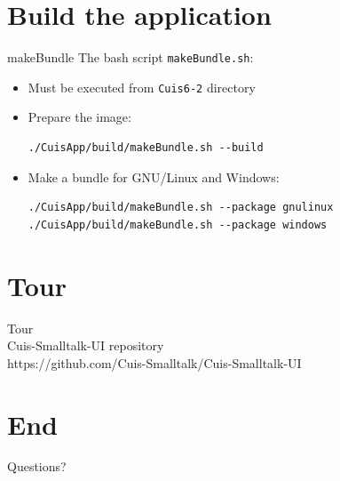 \documentclass{beamer}
\begin{document}
\begin{lstlisting}[language=Smalltalk]
\end{lstlisting}

\section{Build the application}
\begin{frame}[fragile]{makeBundle}
  The bash script \texttt{makeBundle.sh}:
  \begin{itemize}
  \item Must be executed from \texttt{Cuis6-2} directory
  \item Prepare the image:
\begin{verbatim}
./CuisApp/build/makeBundle.sh --build
\end{verbatim}
  \item Make a bundle for GNU/Linux and Windows:
\begin{verbatim}
./CuisApp/build/makeBundle.sh --package gnulinux
./CuisApp/build/makeBundle.sh --package windows
\end{verbatim}
  \end{itemize}
\end{frame}  

\section{Tour}
\begin{frame}
  \begin{center}
    Tour\\
    Cuis-Smalltalk-UI repository \\
    https://github.com/Cuis-Smalltalk/Cuis-Smalltalk-UI
  \end{center}
\end{frame}

\section*{End}
\begin{frame}
  \begin{center}
    \fontsize{16pt}{8pt}\selectfont

  Questions?
\end{center}
\end{frame}
\end{document}
